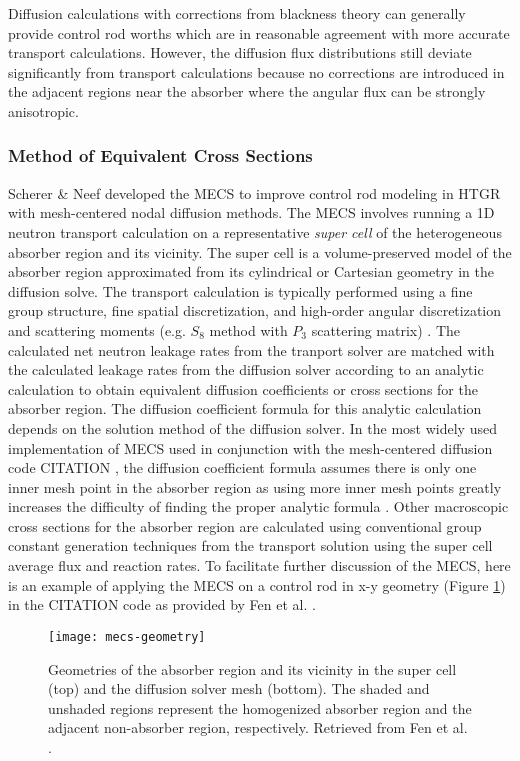 Diffusion calculations with corrections from blackness theory can generally provide control rod
worths which are in reasonable agreement with more accurate transport calculations. However, the
diffusion flux distributions still deviate significantly from transport calculations because no
corrections are introduced in the adjacent regions near the absorber where the angular flux can be
strongly anisotropic.

\subsubsection{Method of Equivalent Cross Sections}

Scherer \& Neef developed the \gls{MECS} \cite{scherer_determination_1976} to improve control rod
modeling in \gls{HTGR} with mesh-centered nodal diffusion methods. The \gls{MECS} involves running
a 1D neutron transport calculation on a representative \textit{super cell} of the heterogeneous
absorber region and its vicinity. The super cell is a volume-preserved model of the absorber region
approximated from its cylindrical or Cartesian geometry in the diffusion solve. The transport
calculation is typically performed using a fine group structure, fine spatial discretization, and
high-order angular discretization and scattering moments (e.g. $S_8$ method with $P_3$ scattering
matrix) \cite{fen_modelling_1992}. The calculated net neutron leakage rates from the tranport
solver are matched with the calculated leakage rates from the diffusion solver according to an
analytic calculation to obtain equivalent diffusion coefficients or cross sections for the absorber
region. The diffusion coefficient formula for this analytic calculation depends on the solution
method of the diffusion solver. In the most widely used implementation of \gls{MECS} used in
conjunction with the mesh-centered diffusion code CITATION \cite{teuchert_vsop94_1994}, the
diffusion coefficient formula assumes there is only one inner mesh point in the absorber region as
using more inner mesh points greatly increases the difficulty of finding the proper analytic
formula \cite{fen_modelling_1992}. Other macroscopic cross sections for the absorber region are
calculated using conventional group constant generation techniques from the transport solution
using the super cell average flux and reaction rates. To facilitate further discussion of the
\gls{MECS}, here is an example of applying the \gls{MECS} on a control rod in x-y geometry (Figure
\ref{fig:mecs-geometry}) in the CITATION code as provided by Fen et al. \cite{fen_modelling_1992}.
%
\begin{figure}[htb]
    \centering
    \texttt{[image: mecs-geometry]}
    \caption{Geometries of the absorber region and its vicinity in the super
        cell (top) and the diffusion solver mesh (bottom).
        The shaded and unshaded regions represent the homogenized absorber
        region and the adjacent non-absorber region, respectively.
        Retrieved from Fen et al. \cite{fen_modelling_1992}.}
    \label{fig:mecs-geometry}
\end{figure}

